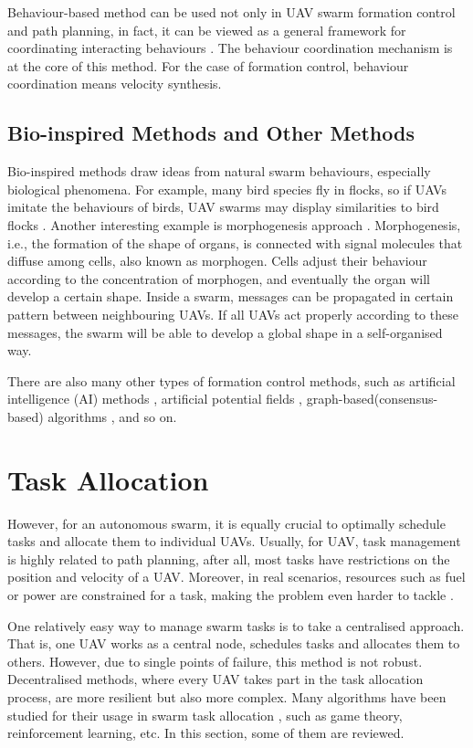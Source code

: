 Behaviour-based method can be used not only in UAV swarm
formation control and path planning, in fact, it can be viewed as a
general framework for coordinating interacting behaviours \parencite{Kamel2020}.
The behaviour coordination mechanism is at the core of this method.
For the case of formation control, behaviour coordination means velocity synthesis.

\subsection{Bio-inspired Methods and Other Methods}

Bio-inspired methods draw ideas from natural swarm behaviours,
especially biological phenomena.
For example, many bird species fly in flocks,
so if UAVs imitate the behaviours of birds, UAV swarms may display similarities to
bird flocks \parencite{Ma2022, Reynolds1987}.
Another interesting example is morphogenesis approach \parencite{Ma2022, MAMEI2004}.
Morphogenesis, i.e., the formation of the shape of organs,
is connected with signal molecules that diffuse among cells, also known as morphogen.
Cells adjust their behaviour according to the concentration of morphogen,
and eventually the organ will develop a certain shape.
Inside a swarm, messages can be propagated in certain pattern between neighbouring UAVs.
If all UAVs act properly according to these messages,
the swarm will be able to develop a global shape in a self-organised way.

There are also many other types of formation control methods,
such as artificial intelligence (AI) methods \parencite{PuenteCastro2022},
artificial potential fields \parencite{Shahzad2023, Wang2006, Schneider2003},
graph-based(consensus-based) algorithms \parencite{Ouyang2023, Kamel2020},
and so on.

\section{Task Allocation}

However, for an autonomous swarm,
it is equally crucial to optimally schedule tasks and allocate them to individual UAVs.
Usually, for UAV, task management is highly related to path planning,
after all, most tasks have restrictions on the position and velocity of a UAV.
Moreover, in real scenarios, resources such as fuel or power are constrained for a task,
making the problem even harder to tackle \parencite{Javed2024, Zhou2020}.

One relatively easy way to manage swarm tasks is to take a centralised approach.
That is, one UAV works as a central node, schedules tasks and allocates them to others.
However, due to single points of failure, this method is not robust.
Decentralised methods, where every UAV takes part in the task allocation process,
are more resilient but also more complex.
Many algorithms have been studied for their usage
in swarm task allocation \cite{Peng2021, Plathottam2018},
such as game theory, reinforcement learning, etc.
In this section, some of them are reviewed.


